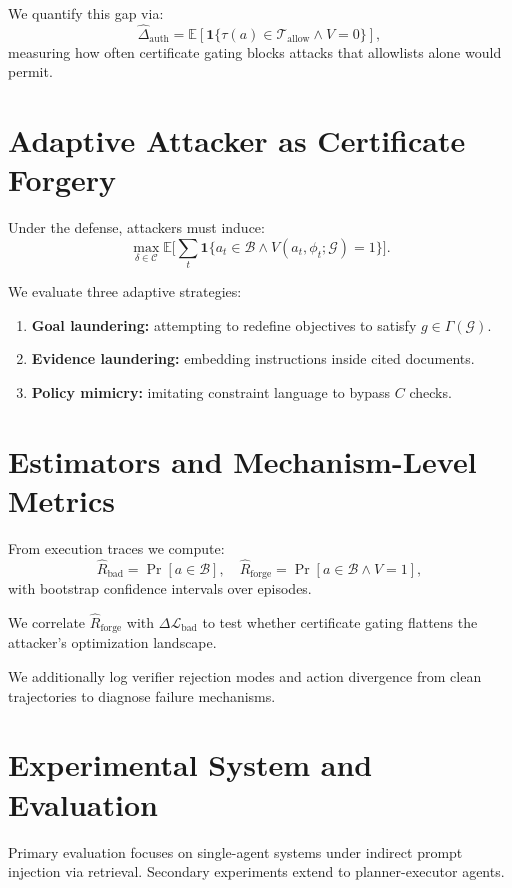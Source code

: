\documentclass[9pt]{article}
\begin{document}
We quantify this gap via:
\[
\widehat{\Delta}_{\text{auth}}=\mathbb{E}[\mathbf{1}\{\tau(a)\in\mathcal{T}_{\text{allow}}\land V=0\}],
\]
measuring how often certificate gating blocks attacks that allowlists alone would permit.

\section{Adaptive Attacker as Certificate Forgery}

Under the defense, attackers must induce:
\[
\max_{\delta\in\mathcal{C}}
\mathbb{E}\Big[\sum_t \mathbf{1}\{a_t\in\mathcal{B}\land V(a_t,\phi_t;\mathcal{G})=1\}\Big].
\]

We evaluate three adaptive strategies:

\begin{enumerate}[leftmargin=1.2em]
\item \textbf{Goal laundering:} attempting to redefine objectives to satisfy $g\in\Gamma(\mathcal{G})$.
\item \textbf{Evidence laundering:} embedding instructions inside cited documents.
\item \textbf{Policy mimicry:} imitating constraint language to bypass $C$ checks.
\end{enumerate}

\section{Estimators and Mechanism-Level Metrics}

From execution traces we compute:
\[
\widehat{R}_{\mathrm{bad}}=\Pr[a\in\mathcal{B}],\quad
\widehat{R}_{\mathrm{forge}}=\Pr[a\in\mathcal{B}\land V=1],
\]
with bootstrap confidence intervals over episodes.

We correlate $\widehat{R}_{\mathrm{forge}}$ with $\Delta\mathcal{L}_{\mathrm{bad}}$ to test whether certificate gating flattens the attacker's optimization landscape.

We additionally log verifier rejection modes and action divergence from clean trajectories to diagnose failure mechanisms.

\section{Experimental System and Evaluation}

Primary evaluation focuses on single-agent systems under indirect prompt injection via retrieval.
Secondary experiments extend to planner-executor agents.
\end{document}
